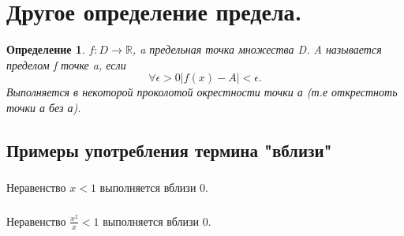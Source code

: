 \documentclass[a4paper]{article}
\newtheorem{definition}{Определение}
\begin{document}
\section{Другое определение предела.}
\begin{definition}
$f : D \to \mathbb{R}$, a предельная точка множества D. 
A называется пределом f точке a, если 
 \[
\forall \epsilon > 0 | f(x) - A | < \epsilon
.\] 
Выполняется в некоторой проколотой окрестности
точки а (т.е открестноть точки а без а).
\end{definition}
\subsection{Примеры употребления термина "вблизи"}
\subsubsection{}
Неравенство $x < 1$ выполняется вблизи 0.
\subsubsection{}
Неравенство $\frac{x^2}{x} < 1$ выполняется вблизи 0.
\end{document}
